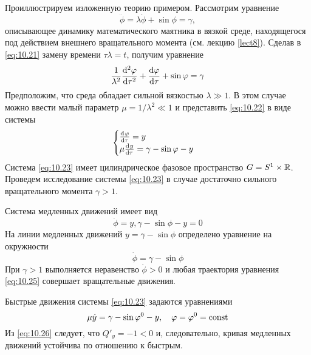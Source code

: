 Проиллюстрируем изложенную теорию примером. Рассмотрим уравнение
\begin{equation}
        \label{eq:10.21}
        \ddot \phi = \lambda \dot \phi + \sin \phi = \gamma,
\end{equation}
описывающее динамику математического маятника в вязкой  среде, находящегося под действием внешнего вращательного момента (см. лекцию \ref{lect8}). Сделав в \eqref{eq:10.21} замену времени $\tau \lambda = t$, получим уравнение
\begin{equation}
        \label{eq:10.22}
        \frac{1}{\lambda^2} \dv[2]{\varphi}{\tau} + \dv{\varphi}{\tau} + \sin \varphi =\gamma
\end{equation}
Предположим, что среда обладает сильной вязкостью $\lambda \gg 1 $. В этом случае можно ввести малый параметр $\mu = 1 / \lambda^2 \ll 1$ и представить \eqref{eq:10.22} в виде системы
\begin{equation}
        \label{eq:10.23}
        \begin{cases}
                \dv[]{\varphi}{\tau} = y\\
               \mu \dv[]{y}{\tau} = \gamma - \sin \varphi - y  
        \end{cases}
\end{equation}
Система \eqref{eq:10.23} имеет цилиндрическое фазовое пространство $G = S^1 \times \mathbb{R}$.
Проведем исследование системы \eqref{eq:10.23} в случае достаточно сильного 
вращательного момента $\gamma>1$.

Система медленных движений имеет вид
\begin{equation}
        \label{eq:10.24}
        \dot \phi = y, \gamma - \sin \phi - y = 0
\end{equation}
На линии медленных движений $y=\gamma-\sin \phi$ определено уравнение на окружности
\begin{equation}
        \label{eq:10.25}
        \dot \phi = \gamma - \sin \phi
\end{equation}
При $\gamma>1$ выполняется неравенство $\dot \phi>0$ и любая траектория уравнения \eqref{eq:10.25} совершает вращательные движения.

Быстрые движения системы \eqref{eq:10.23} задаются уравнениями
\begin{equation}
        \label{eq:10.26}
        \mu \dot y = \gamma - \sin \varphi^0 -y, \quad \varphi=\varphi^{0} = \textrm{const}
\end{equation}
Из \eqref{eq:10.26} следует, что $Q'_y=-1<0$ и, следовательно, кривая медленных движений устойчива по 
отношению к быстрым.

